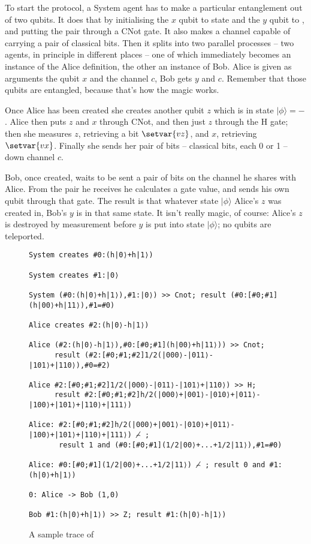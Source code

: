 \documentclass[11pt,a4paper]{article}
\begin{document}
To start the protocol, a System agent has to make a particular entanglement out of two qubits. It does that by initialising the $x$ qubit to state \zero{} and the $y$ qubit to \plus, and putting the pair through a CNot gate. It also makes a channel capable of carrying a pair of classical bits. Then it splits into two parallel processes -- two agents, in principle in different places -- one of which immediately becomes an instance of the Alice definition, the other an instance of Bob. Alice is given as arguments the qubit $x$ and the channel $c$, Bob gets $y$ and $c$. Remember that those qubits are entangled, because that's how the magic works.

Once Alice has been created she creates another qubit $z$ which is in state $|\phi\rangle=\minus$. Alice then puts $z$ and $x$ through CNot, and then just $z$ through the H gate; then she measures $z$, retrieving a bit $\setvar{vz}$, and $x$, retrieving $\setvar{vx}$. Finally she sends her pair of bits -- classical bits, each 0 or 1 -- down channel $c$.

Bob, once created, waits to be sent a pair of bits on the channel he shares with Alice. From the pair he receives he calculates a gate value, and sends his own qubit through that gate. The result is that whatever state $|\phi\rangle$ Alice's $z$ was created in, Bob's $y$ is in that same state. It isn't really magic, of course: Alice's $z$ is destroyed by measurement before $y$ is put into state $|\phi\rangle$; no qubits are teleported. 

\begin{figure}
\centering
\begin{verbatim}
System creates #0:(h|0⟩+h|1⟩)

System creates #1:|0⟩

System (#0:(h|0⟩+h|1⟩),#1:|0⟩) >> Cnot; result (#0:[#0;#1](h|00⟩+h|11⟩),#1=#0)

Alice creates #2:(h|0⟩-h|1⟩)

Alice (#2:(h|0⟩-h|1⟩),#0:[#0;#1](h|00⟩+h|11⟩)) >> Cnot; 
      result (#2:[#0;#1;#2]1/2(|000⟩-|011⟩-|101⟩+|110⟩),#0=#2)

Alice #2:[#0;#1;#2]1/2(|000⟩-|011⟩-|101⟩+|110⟩) >> H; 
      result #2:[#0;#1;#2]h/2(|000⟩+|001⟩-|010⟩+|011⟩-|100⟩+|101⟩+|110⟩+|111⟩)

Alice: #2:[#0;#1;#2]h/2(|000⟩+|001⟩-|010⟩+|011⟩-|100⟩+|101⟩+|110⟩+|111⟩) ⌢̸ ; 
       result 1 and (#0:[#0;#1](1/2|00⟩+...+1/2|11⟩),#1=#0)

Alice: #0:[#0;#1](1/2|00⟩+...+1/2|11⟩) ⌢̸ ; result 0 and #1:(h|0⟩+h|1⟩)

0: Alice -> Bob (1,0)

Bob #1:(h|0⟩+h|1⟩) >> Z; result #1:(h|0⟩-h|1⟩)
\end{verbatim}
\caption{A sample trace of }
\end{figure}
\end{document}
